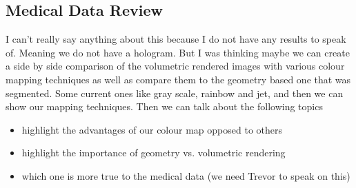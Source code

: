 \subsection{Medical Data Review}
I can't really say anything about this because I do not have any results to speak of.  Meaning we do not have a hologram.  But I was thinking maybe we can create a side by side comparison of the volumetric rendered images with various colour mapping techniques as well as compare them to the geometry based one that was segmented.  Some current ones like gray scale, rainbow and jet, and then we can show our mapping techniques. Then we can talk about the following topics
\begin{itemize}
    \item highlight the advantages of our colour map opposed to others
    \item highlight the importance of geometry vs. volumetric rendering
    \item which one is more true to the medical data (we need Trevor to speak on this)
\end{itemize}
